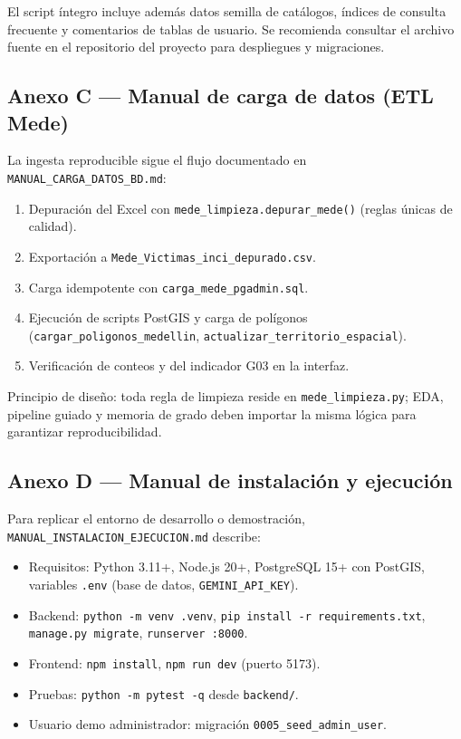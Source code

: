 El script íntegro incluye además datos semilla de catálogos, índices de consulta frecuente y comentarios de tablas de usuario. Se recomienda consultar el archivo fuente en el repositorio del proyecto para despliegues y migraciones.

\subsection{Anexo C — Manual de carga de datos (ETL Mede)}

La ingesta reproducible sigue el flujo documentado en \texttt{MANUAL\_CARGA\_DATOS\_BD.md}:

\begin{enumerate}
	\item Depuración del Excel con \texttt{mede\_limpieza.depurar\_mede()} (reglas únicas de calidad).
	\item Exportación a \texttt{Mede\_Victimas\_inci\_depurado.csv}.
	\item Carga idempotente con \texttt{carga\_mede\_pgadmin.sql}.
	\item Ejecución de scripts PostGIS y carga de polígonos (\texttt{cargar\_poligonos\_medellin}, \texttt{actualizar\_territorio\_espacial}).
	\item Verificación de conteos y del indicador G03 en la interfaz.
\end{enumerate}

Principio de diseño: toda regla de limpieza reside en \texttt{mede\_limpieza.py}; EDA, pipeline guiado y memoria de grado deben importar la misma lógica para garantizar reproducibilidad.

\subsection{Anexo D — Manual de instalación y ejecución}

Para replicar el entorno de desarrollo o demostración, \texttt{MANUAL\_INSTALACION\_EJECUCION.md} describe:

\begin{itemize}
	\item Requisitos: Python 3.11+, Node.js 20+, PostgreSQL 15+ con PostGIS, variables \texttt{.env} (base de datos, \texttt{GEMINI\_API\_KEY}).
	\item Backend: \texttt{python -m venv .venv}, \texttt{pip install -r requirements.txt}, \texttt{manage.py migrate}, \texttt{runserver :8000}.
	\item Frontend: \texttt{npm install}, \texttt{npm run dev} (puerto 5173).
	\item Pruebas: \texttt{python -m pytest -q} desde \texttt{backend/}.
	\item Usuario demo administrador: migración \texttt{0005\_seed\_admin\_user}.
\end{itemize}

